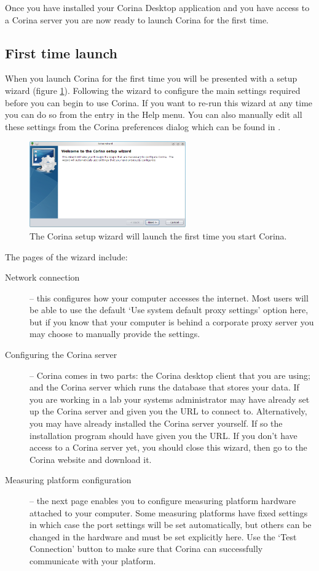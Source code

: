 Once you have installed your Corina Desktop application and you have access to a Corina server you are now ready to launch Corina for the first time.

\subsection{First time launch}
When you launch Corina for the first time you will be presented with a setup wizard (figure \ref{fig:setupwizard}).  Following the wizard to configure the main settings required before you can begin to use Corina.  If you want to re-run this wizard at any time you can do so from the entry in the Help menu. You can also manually edit all these settings from the Corina preferences dialog which can be found in .

\begin{figure}[hbtp]
  \centering
    \includegraphics[width=0.6\textwidth]{Images/setupwizard.png}
  \caption{The Corina setup wizard will launch the first time you start Corina.}
  \label{fig:setupwizard}
\end{figure}

The pages of the wizard include:

\begin{description}
 \item[Network connection] -- this configures how your computer accesses the internet.  Most users will be able to use the default `Use system default proxy settings' option here, but if you know that your computer is behind a corporate proxy server you may choose to manually provide the settings.
 \item[Configuring the Corina server] -- Corina comes in two parts: the Corina desktop client that you are using; and the Corina server which runs the database that stores your data.  If you are working in a lab your systems administrator may have already set up the Corina server and given you the URL to connect to.  Alternatively, you may have already installed the Corina server yourself.  If so the installation program should have given you the URL. If you don't have access to a Corina server yet, you should close this wizard, then go to the Corina website and download it.
 \item[Measuring platform configuration] -- the next page enables you to configure measuring platform hardware attached to your computer.  Some measuring platforms have fixed settings in which case the port settings will be set automatically, but others can be changed in the hardware and must be set explicitly here. Use the `Test Connection' button to make sure that Corina can successfully communicate with your platform.
\end{description}


